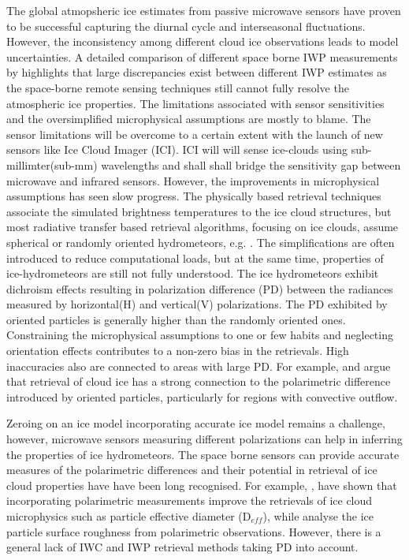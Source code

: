 \documentclass[amt, manuscript]{copernicus}
\begin{document}
The global atmopsheric ice estimates from passive microwave sensors have proven to be successful capturing the diurnal cycle and interseasonal fluctuations. However, the inconsistency among different cloud ice observations leads to model uncertainties. A detailed comparison of different space borne IWP measurements by \citet{duncan:anupd:18, eliasson:asses:11} highlights that large discrepancies exist between different IWP estimates as the space-borne remote sensing techniques still cannot fully resolve the atmospheric ice properties. The limitations associated with sensor sensitivities and the oversimplified microphysical assumptions are mostly to blame. The sensor limitations will be overcome to a certain extent with the launch of new sensors like Ice Cloud Imager (ICI). ICI will will sense ice-clouds using sub-millimter(sub-mm) wavelengths and shall shall bridge the sensitivity gap between microwave and infrared sensors. However, the improvements in microphysical assumptions has seen slow progress. The physically based retrieval techniques associate the simulated brightness temperatures to the ice cloud structures, but most radiative transfer based retrieval algorithms, focusing on ice clouds, assume spherical or randomly oriented hydrometeors, e.g. \citep{evans:icecl:05, Zhao:retri:02}. The simplifications are often introduced to reduce computational loads, but at the same time, properties of ice-hydrometeors are still not fully understood. The ice hydrometeors exhibit dichroism effects resulting in polarization difference (PD) between the radiances measured by horizontal(H) and vertical(V) polarizations. The PD exhibited by oriented particles is generally higher than the randomly oriented ones. Constraining the microphysical assumptions to one or few habits and neglecting  orientation effects contributes to a non-zero bias in the retrievals. High inaccuracies also are connected to areas with large PD. For example, \citet{gong:micro:17} and \citep{miao:thepo:03} argue that retrieval of cloud ice has a strong connection to the polarimetric difference introduced by oriented particles, particularly for regions with convective outflow. 

Zeroing on an ice model incorporating accurate ice model remains a challenge, however, microwave sensors measuring different polarizations can help in inferring the properties of ice hydrometeors. The space borne sensors can provide accurate measures of the polarimetric differences and their potential in retrieval of ice cloud properties have have been long recognised. For example, \citep{coy:sensi:20}, have shown  that incorporating polarimetric measurements improve the retrievals of ice cloud microphysics such as particle effective diameter (D$_{eff}$), while \citep{hioki:degre:16} analyse the ice particle surface roughness from polarimetric observations. However, there is a general lack of  IWC and IWP retrieval methods taking PD into account.
\end{document}
